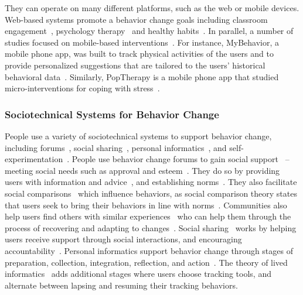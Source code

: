 They can operate on many different platforms, such as the web or mobile devices. Web-based systems promote a behavior change goals including classroom engagement~\cite{anderson2014engaging, anderson2013steering}, psychology therapy~\cite{doi:10.1080/15228830802094429} and healthy habits~\cite{cugelman2013gamification, lyons2014behavior}. In parallel, a number of studies focused on mobile-based interventions~\cite{paredes2014poptherapy, RILEY201567, FJELDSOE2009165, Whittaker09, info:doi/10.2196/mhealth.4160}. For instance, MyBehavior, a mobile phone app, was built to track physical activities of the users and to provide personalized suggestions that are tailored to the users' historical behavioral data~\cite{info:doi/10.2196/mhealth.4160}. Similarly, PopTherapy is a mobile phone app that studied micro-interventions for coping with stress~\cite{paredes2014poptherapy}.

\subsubsection{Sociotechnical Systems for Behavior Change}

People use a variety of sociotechnical systems to support behavior change, including forums~\cite{eysenbach2004health, chancellornorms}, social sharing~\cite{poirier2012social, Chung:2016:BNA:2818048.2819926, pina2017personal, Ko:2015:NGI:2675133.2675244}, personal informatics~\cite{li2010stage, Chung:2017:PTB:3025453.3025747}, and self-experimentation~\cite{Karkar:2017:TFS:3025453.3025480}. People use behavior change forums to gain social support~\cite{hong2012outcomes} -- meeting social needs such as approval and esteem~\cite{kaplan1977social}. They do so by providing users with information and advice~\cite{hong2012outcomes}, and establishing norms~\cite{chancellornorms}. They also facilitate social comparisons~\cite{davison2000talks} which influence behaviors, as social comparison theory states that users seek to bring their behaviors in line with norms~\cite{festinger1954theory}. Communities also help users find others with similar experiences~\cite{huh2014health} who can help them through the process of recovering and adapting to changes~\cite{newman2011s}. Social sharing~\cite{poirier2012social, richardson2010online} works by helping users receive support through social interactions, and encouraging accountability~\cite{epstein2015nobody}. Personal informatics support behavior change through stages of preparation, collection, integration, reflection, and action~\cite{li2010stage}. The theory of lived informatics~\cite{epstein2015lived} adds additional stages where users choose tracking tools, and alternate between lapsing and resuming their tracking behaviors. %


